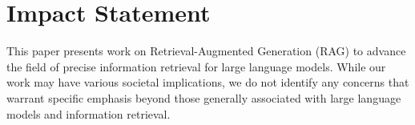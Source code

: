 \documentclass{article}
\theoremstyle{plain}
\theoremstyle{definition}
\theoremstyle{remark}
\begin{document}


 

\section*{Impact Statement}
This paper presents work on Retrieval-Augmented Generation (RAG) to advance the field of precise information retrieval for large language models. While our work may have various societal implications, we do not identify any concerns that warrant specific emphasis beyond those generally associated with large language models and information retrieval.






\end{document}
